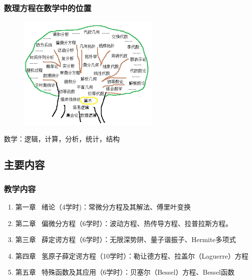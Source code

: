 \begin{frame}
	\frametitle{数理方程在数学中的位置}
	\begin{center}
		\begin{figure}
			\includegraphics[width=7cm]{figs/fig1-1.png}	
		\end{figure}
		{ 数学：逻辑，计算，分析，统计，结构}
	\end{center}
\end{frame}

\subsection{主要内容}

\begin{frame}
	\frametitle{教学内容}
	\begin{enumerate}
			\item 第一章 ~绪论（4学时)：常微分方程及其解法、傅里叶变换
			 \vspace{0.2cm}
			 \item 第二章~ 偏微分方程（6学时）：波动方程、热传导方程、拉普拉斯方程。
			 \vspace{0.2cm}
			 \item 第三章 ~薛定谔方程（6学时）：无限深势阱、量子谐振子、Hermite多项式
            \vspace{0.2cm}
            \item 第四章 ~氢原子薛定谔方程（10学时）：勒让德方程、拉盖尔（Laguerre）方程
            \vspace{0.2cm}
            \item 第五章~ 特殊函数及其应用（6学时）：贝塞尔（Bessel）方程、Bessel函数
     \end{enumerate}	
\end{frame}

